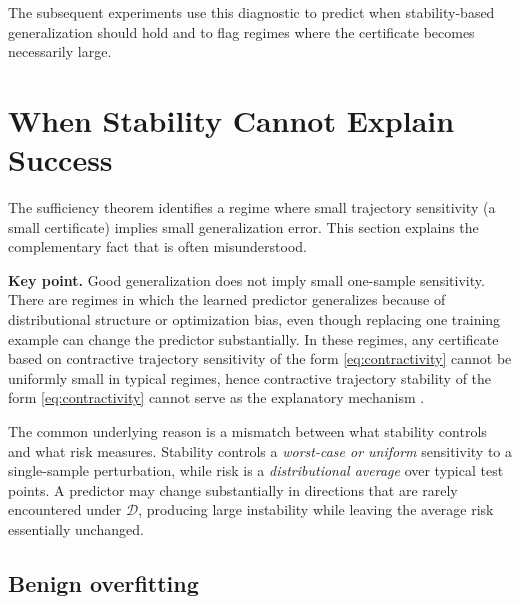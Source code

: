 \documentclass{article}
\numberwithin{equation}{section}
\begin{document}
The subsequent experiments use this diagnostic to predict when stability-based generalization should hold and to flag regimes where the certificate becomes necessarily large.

\section{When Stability Cannot Explain Success}
\label{sec:nonstability}

The sufficiency theorem identifies a regime where small trajectory sensitivity (a small certificate) implies small generalization error.
This section explains the complementary fact that is often misunderstood.

\smallskip
\noindent\textbf{Key point.}
Good generalization does not imply small one-sample sensitivity. There are regimes in which the learned predictor generalizes because of distributional structure or optimization bias, even though replacing one training example can change the predictor substantially. In these regimes, any certificate based on contractive trajectory sensitivity of the form \eqref{eq:contractivity} cannot be uniformly small in typical regimes, hence contractive trajectory stability of the form \eqref{eq:contractivity} cannot serve as the explanatory mechanism \cite{bousquet2002stability}.

The common underlying reason is a mismatch between what stability controls and what risk measures. Stability controls a \emph{worst-case or uniform} sensitivity to a single-sample perturbation, while risk is a \emph{distributional average} over typical test points. A predictor may change substantially in directions that are rarely encountered under $\mathcal{D}$, producing large instability while leaving the average risk essentially unchanged.

\subsection{Benign overfitting}
\label{subsec:benign-overfitting}
\end{document}
